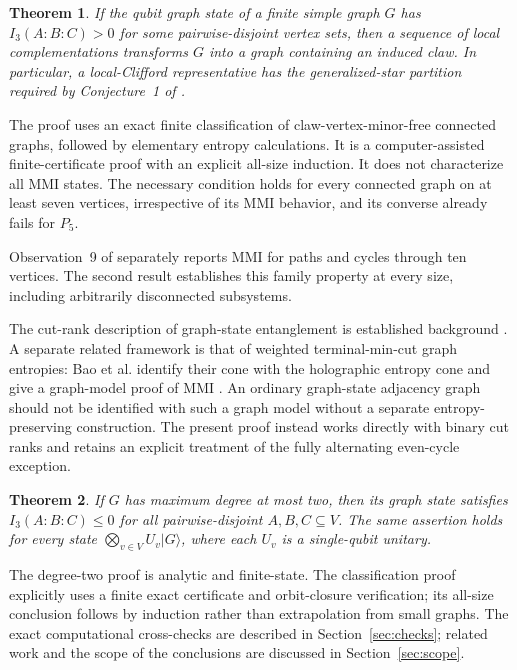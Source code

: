 \documentclass[11pt,letterpaper]{article}
\newtheorem{theorem}{Theorem}
\newcommand{\Ithree}{I_3}
\begin{document}
\begin{theorem}\label{thm:claw}
If the qubit graph state of a finite simple graph $G$ has $\Ithree(A:B:C)>0$ for some pairwise-disjoint vertex sets, then a sequence of local complementations transforms $G$ into a graph containing an induced claw. In particular, a local-Clifford representative has the generalized-star partition required by Conjecture~1 of \cite{FKMP}.
\end{theorem}

The proof uses an exact finite classification of claw-vertex-minor-free connected graphs, followed by elementary entropy calculations. It is a computer-assisted finite-certificate proof with an explicit all-size induction. It does not characterize all MMI states. The necessary condition holds for every connected graph on at least seven vertices, irrespective of its MMI behavior, and its converse already fails for $P_5$.

Observation~9 of \cite{FKMP} separately reports MMI for paths and cycles through ten vertices. The second result establishes this family property at every size, including arbitrarily disconnected subsystems.

The cut-rank description of graph-state entanglement is established background \cite{Hein2004,Hein2006}. A separate related framework is that of weighted terminal-min-cut graph entropies: Bao et al. identify their cone with the holographic entropy cone and give a graph-model proof of MMI \cite[Definition~2, Theorem~5 and Section~4.1]{Bao}. An ordinary graph-state adjacency graph should not be identified with such a graph model without a separate entropy-preserving construction. The present proof instead works directly with binary cut ranks and retains an explicit treatment of the fully alternating even-cycle exception.

\begin{theorem}\label{thm:main}
If $G$ has maximum degree at most two, then its graph state satisfies $\Ithree(A:B:C)\leq0$ for all pairwise-disjoint $A,B,C\subseteq V$. The same assertion holds for every state $\bigotimes_{v\in V}U_v|G\rangle$, where each $U_v$ is a single-qubit unitary.
\end{theorem}

The degree-two proof is analytic and finite-state. The classification proof explicitly uses a finite exact certificate and orbit-closure verification; its all-size conclusion follows by induction rather than extrapolation from small graphs. The exact computational cross-checks are described in Section~\ref{sec:checks}; related work and the scope of the conclusions are discussed in Section~\ref{sec:scope}.
\end{document}
